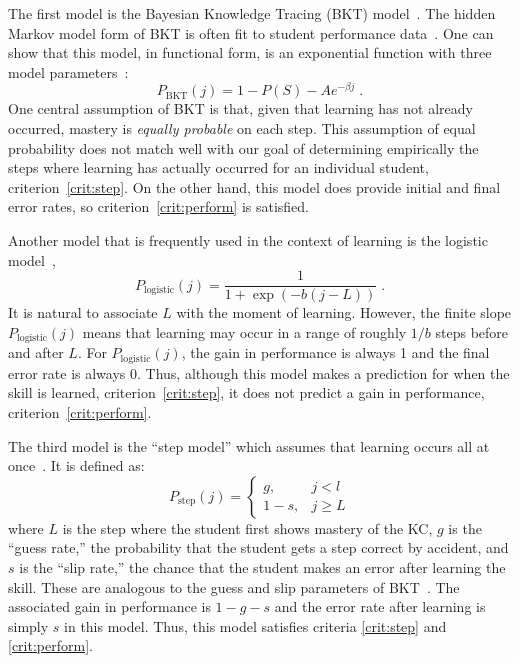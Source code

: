 \documentclass{acmlarge-edm}
\begin{document}
The first model is the Bayesian Knowledge Tracing (BKT) 
model~\cite{corbett_knowledge_1994}.  The hidden Markov model
form of BKT is often fit to student performance 
data~\cite{beck_identifiability:_2007}.  One can show that
this model, in functional form, is an exponential function
with three model parameters~\cite{van_de_sande_bayesian_2012}:
%
\begin{equation}
         P_\mathrm{BKT}(j) = 1-P(S) -A e^{-\beta j} \; .
\end{equation}
%
One central assumption of BKT is that, given that learning
has not already occurred, mastery is {\em equally probable} on each step.
This assumption of equal probability does not match well with 
our goal of determining empirically the steps where learning has 
actually occurred for an individual student, criterion~\ref{crit:step}.
On the other hand, this model does provide initial and final
error rates, so criterion~\ref{crit:perform} is satisfied. 

Another model that is frequently used in the context of learning is
the logistic
model~\cite{cen_learning_2006,min_chi_instructional_2011},
%
\begin{equation}
    P_\mathrm{logistic}(j)= \frac{1}{1+\exp\left(-b (j-L)\right)} \; .
\end{equation}
%
It is natural to associate $L$ with the moment of learning.  However,
the finite slope $P_\mathrm{logistic}(j)$ means that learning may
occur in a range of roughly $1/b$ steps before and after $L$.  For
$P_\mathrm{logistic}(j)$, the gain in performance is always 1 and the
final error rate is always 0.  Thus, although this model makes a
prediction for when the skill is learned, criterion~\ref{crit:step},
it does not predict a gain in performance,
criterion~\ref{crit:perform}.

The third model is the ``step model'' which assumes that learning 
occurs all at once~\cite{baker_detecting_2011}.  It is defined as:
%
\begin{equation}
    P_\mathrm{step}(j)= \left\{\begin{array}{cc}
                 g, & j<l \\
                 1-s, & j\ge L 
                 \end{array} \right. 
\end{equation}
%
where $L$ is the step where the student first shows mastery of the KC,
$g$ is the ``guess rate,'' the probability that the student gets a
step correct by accident, and $s$ is the ``slip rate,'' the chance
that the student makes an error after learning the skill.  These are
analogous to the guess and slip parameters of
BKT~\cite{corbett_knowledge_1994}.  The associated gain in performance
is $1-g-s$ and the error rate after learning is simply $s$ in this
model.  Thus, this model satisfies criteria \ref{crit:step} and
\ref{crit:perform}.
\end{document}
